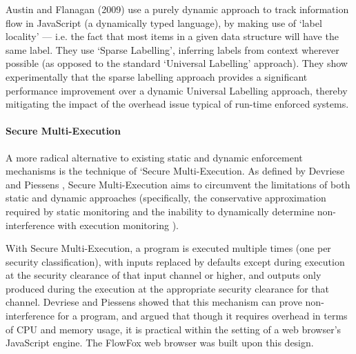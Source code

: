 Austin and Flanagan (2009) \cite{austin2009dynamicif} use a purely dynamic approach to track information flow in JavaScript (a dynamically typed language), by making use of `label locality' --- i.e. the fact that most items in a given data structure will have the same label. They use `Sparse Labelling', inferring labels from context wherever possible (as opposed to the standard `Universal Labelling' approach). They show experimentally that the sparse labelling approach provides a significant performance improvement over a dynamic Universal Labelling approach, thereby mitigating the impact of the overhead issue typical of run-time enforced systems.

\paragraph{Secure Multi-Execution}

A more radical alternative to existing static and dynamic enforcement mechanisms is the technique of `Secure Multi-Execution. As defined by Devriese and Piessens \cite{devriese2010sme}, Secure Multi-Execution aims to circumvent the limitations of both static and dynamic approaches (specifically, the conservative approximation required by static monitoring and the inability to dynamically determine non-interference with execution monitoring \cite{schneider2000executionmonitoring}).

With Secure Multi-Execution, a program is executed multiple times (one per security classification), with inputs replaced by defaults except during execution at the security clearance of that input channel or higher, and outputs only produced during the execution at the appropriate security clearance for that channel. Devriese and Piessens \cite{devriese2010sme} showed that this mechanism can prove non-interference for a program, and argued that though it requires overhead in terms of CPU and memory usage, it is practical within the setting of a web browser's JavaScript engine. The FlowFox web browser \cite{degroef2012flowfox} was built upon this design.
	